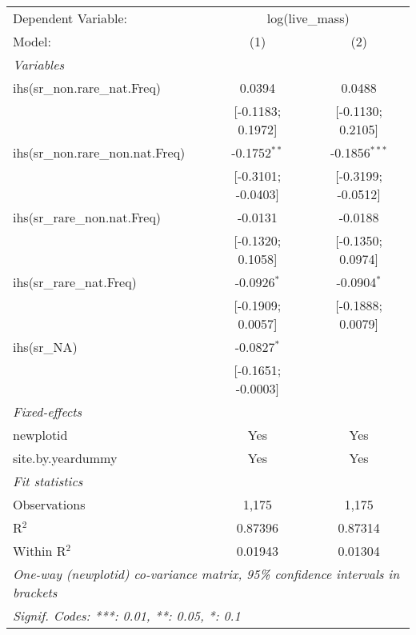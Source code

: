 \begin{tabular}{lcc}
\tabularnewline\midrule\midrule
Dependent Variable:&\multicolumn{2}{c}{log(live\_mass)}\\
Model:&(1) & (2)\\
\midrule \emph{Variables}&   &  \\
ihs(sr\_non.rare\_nat.Freq)&0.0394 & 0.0488\\
  &[-0.1183; 0.1972] & [-0.1130; 0.2105]\\
ihs(sr\_non.rare\_non.nat.Freq)&-0.1752$^{**}$ & -0.1856$^{***}$\\
  &[-0.3101; -0.0403] & [-0.3199; -0.0512]\\
ihs(sr\_rare\_non.nat.Freq)&-0.0131 & -0.0188\\
  &[-0.1320; 0.1058] & [-0.1350; 0.0974]\\
ihs(sr\_rare\_nat.Freq)&-0.0926$^{*}$ & -0.0904$^{*}$\\
  &[-0.1909; 0.0057] & [-0.1888; 0.0079]\\
ihs(sr\_NA)&-0.0827$^{*}$ &   \\
  &[-0.1651; -0.0003] &   \\
\midrule \emph{Fixed-effects}&   &  \\
newplotid & Yes & Yes\\
site.by.yeardummy & Yes & Yes\\
\midrule \emph{Fit statistics}&  & \\
Observations & 1,175&1,175\\
R$^2$ & 0.87396&0.87314\\
Within R$^2$ & 0.01943&0.01304\\
\midrule\midrule\multicolumn{3}{l}{\emph{One-way (newplotid) co-variance matrix, 95\% confidence intervals in brackets}}\\
\multicolumn{3}{l}{\emph{Signif. Codes: ***: 0.01, **: 0.05, *: 0.1}}\\
\end{tabular}


